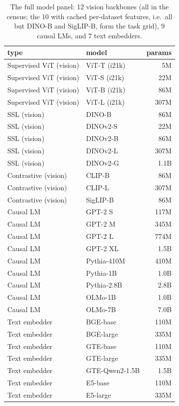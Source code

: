 \begin{table}[h]
\centering
\scriptsize
\begin{tabular}{llr}
\toprule
type & model & params \\
\midrule
Supervised ViT (vision) & ViT-T (i21k) & 5M \\
Supervised ViT (vision) & ViT-S (i21k) & 22M \\
Supervised ViT (vision) & ViT-B (i21k) & 86M \\
Supervised ViT (vision) & ViT-L (i21k) & 307M \\
SSL (vision) & DINO-B & 86M \\
SSL (vision) & DINOv2-S & 22M \\
SSL (vision) & DINOv2-B & 86M \\
SSL (vision) & DINOv2-L & 307M \\
SSL (vision) & DINOv2-G & 1.1B \\
Contrastive (vision) & CLIP-B & 86M \\
Contrastive (vision) & CLIP-L & 307M \\
Contrastive (vision) & SigLIP-B & 86M \\
\midrule
Causal LM & GPT-2 S & 117M \\
Causal LM & GPT-2 M & 345M \\
Causal LM & GPT-2 L & 774M \\
Causal LM & GPT-2 XL & 1.5B \\
Causal LM & Pythia-410M & 410M \\
Causal LM & Pythia-1B & 1.0B \\
Causal LM & Pythia-2.8B & 2.8B \\
Causal LM & OLMo-1B & 1.0B \\
Causal LM & OLMo-7B & 7.0B \\
Text embedder & BGE-base & 110M \\
Text embedder & BGE-large & 335M \\
Text embedder & GTE-base & 110M \\
Text embedder & GTE-large & 335M \\
Text embedder & GTE-Qwen2-1.5B & 1.5B \\
Text embedder & E5-base & 110M \\
Text embedder & E5-large & 335M \\
\bottomrule
\end{tabular}
\caption{The full model panel: 12 vision backbones (all in the census; the 10 with cached per-dataset features, i.e.\ all but DINO-B and SigLIP-B, form the task grid), 9 causal LMs, and 7 text embedders.}
\label{tab:a0}
\end{table}
